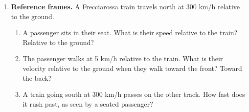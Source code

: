 \documentclass[12pt, twoside]{article}
\begin{document}
\begin{enumerate}[itemsep=0.5cm]
\item \textbf{Reference frames.} A Frecciarossa train travels north at 300 km/h
  relative to the ground.
  \begin{enumerate}[itemsep=0.55cm]
    \item A passenger sits in their seat. What is their speed relative to the train?
      Relative to the ground?
    \item The passenger walks at 5 km/h relative to the train. What is their velocity
      relative to the ground when they walk toward the front? Toward the back?
    \item A train going south at 300 km/h passes on the other track. How fast does
      it rush past, as seen by a seated passenger?
  \end{enumerate}

\end{enumerate}
\end{document}
